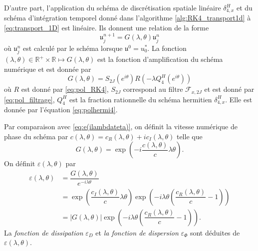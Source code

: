 D'autre part, l'application du schéma de discrétisation spatiale linéaire $\delta_{4,x}^H$ et du schéma d'intégration temporel donné dans l'algorithme \ref{alg:RK4_transport1d} à \eqref{eq:transport_1D} est linéaire. Ils donnent une relation de la forme
\begin{equation}
\mathfrak{u}_j^{n+1} = G(\lambda, \theta) \mathfrak{u}_j^n
\end{equation}
où $\mathfrak{u}_j^n$ est calculé par le schéma lorsque $\mathfrak{u}^0 = u_0^*$. La fonction $(\lambda, \theta) \in \mathbb{R}^+ \times \mathbb{R} \mapsto G(\lambda,\theta)$ est la fonction d'amplification du schéma numérique et est donnée par
\begin{equation}
G(\lambda, \theta) = S_{2J}(e^{i \theta}) R(- \lambda Q^H_{4}(e^{i \theta}) )
\end{equation}
où $R$ est donné par \eqref{eq:pol_RK4}, $S_{2J}$ correspond au filtre $\mathcal{F}_{x,2J}$ et est donné par \eqref{eq:pol_filtrage}, $Q_4^H$ est la fraction rationnelle du schéma hermitien $\delta_{4,x}^H$. Elle est donnée par l'équation \eqref{eq:polhermi4}.

Par comparaison avec \eqref{eq:e(ilambdateta)}, on définit la  vitesse numérique de phase du schéma par $c(\lambda,\theta) = c_R(\lambda,\theta) + i c_I(\lambda,\theta)$ telle que
\begin{equation}
G(\lambda, \theta) = \exp \left( - i \dfrac{c(\lambda,\theta)}{c} \lambda \theta \right).
\end{equation}
On définit $\varepsilon(\lambda, \theta)$ par
\begin{align*}
\varepsilon(\lambda,\theta) & = \dfrac{G(\lambda,\theta)}{e^{- i \lambda \theta}} \\
	& = \exp \left( \dfrac{c_I(\lambda, \theta)}{c} \lambda \theta \right) \exp \left( - i \lambda \theta \left( \dfrac{c_R(\lambda, \theta)}{c} -1 \right) \right) \\
	& = |G(\lambda, \theta)| \exp \left( - i \lambda \theta \left( \dfrac{c_R(\lambda, \theta)}{c} -1 \right) \right).
\end{align*}
La \textit{fonction de dissipation} $\varepsilon_D$ et \textit{la fonction de dispersion} $\varepsilon_{\Phi}$ sont déduites de $\varepsilon(\lambda, \theta)$.

